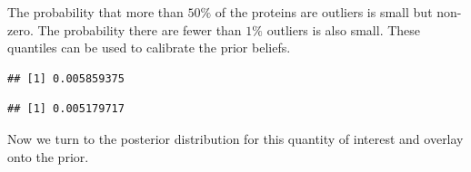 \documentclass[
]{article}
\newenvironment{Shaded}{\begin{snugshade}}{\end{snugshade}}
\newcommand{\CommentTok}[1]{\textcolor[rgb]{0.56,0.35,0.01}{\textit{#1}}}
\newcommand{\DataTypeTok}[1]{\textcolor[rgb]{0.13,0.29,0.53}{#1}}
\newcommand{\DecValTok}[1]{\textcolor[rgb]{0.00,0.00,0.81}{#1}}
\newcommand{\FloatTok}[1]{\textcolor[rgb]{0.00,0.00,0.81}{#1}}
\newcommand{\KeywordTok}[1]{\textcolor[rgb]{0.13,0.29,0.53}{\textbf{#1}}}
\newcommand{\NormalTok}[1]{#1}
\newcommand{\OtherTok}[1]{\textcolor[rgb]{0.56,0.35,0.01}{#1}}
\begin{document}
The probability that more than \(50\%\) of the proteins are outliers is
small but non-zero. The probability there are fewer than \(1\%\)
outliers is also small. These quantiles can be used to calibrate the
prior beliefs.

\begin{Shaded}
\end{Shaded}

\begin{verbatim}
## [1] 0.005859375
\end{verbatim}

\begin{Shaded}
\end{Shaded}

\begin{verbatim}
## [1] 0.005179717
\end{verbatim}

Now we turn to the posterior distribution for this quantity of interest
and overlay onto the prior.
\end{document}
